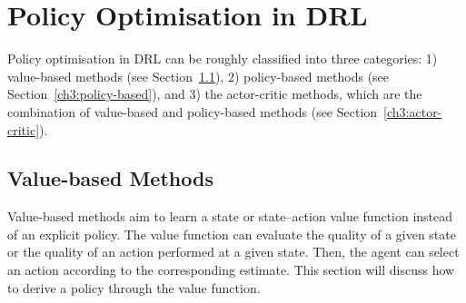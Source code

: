 \section{Policy Optimisation in DRL}
\label{ch3:policy-optim}
Policy optimisation in DRL can be roughly classified into three categories: 1) value-based methods (see Section~\ref{ch3:value-based}), 2) policy-based methods (see Section~\ref{ch3:policy-based}), and 3) the actor-critic methods, which are the combination of value-based and policy-based methods (see Section~\ref{ch3:actor-critic}).

\subsection{Value-based Methods}
\label{ch3:value-based}
Value-based methods aim to learn a state or state--action value function instead of an explicit policy. The value function can evaluate the quality of a given state or the quality of an action performed at a given state. Then, the agent can select an action according to the corresponding estimate. This section will discuss how to derive a policy through the value function.


